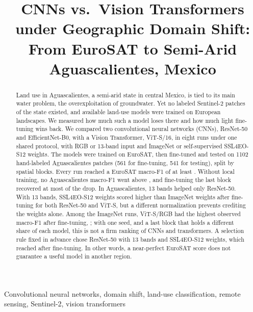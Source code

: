 \documentclass[conference]{IEEEtran}
\begin{document}
\title{CNNs vs.\ Vision Transformers under Geographic Domain Shift:
From EuroSAT to Semi-Arid Aguascalientes, Mexico}

\author{
}

\maketitle

\begin{abstract}
Land use in Aguascalientes, a semi-arid state in central Mexico, is tied to its main water
problem, the overexploitation of groundwater. Yet no labeled Sentinel-2 patches of the state
existed, and available land-use models were trained on European landscapes. We measured how
much such a model loses there and how much light fine-tuning wins back. We compared two
convolutional neural networks (CNNs), ResNet-50 and EfficientNet-B0, with a Vision Transformer,
ViT-S/16, in eight runs under one shared protocol, with RGB or 13-band input and ImageNet or
self-supervised SSL4EO-S12 weights. The models were trained on EuroSAT, then fine-tuned and tested on
\num{1102} hand-labeled Aguascalientes patches (561 for fine-tuning, 541 for testing), split by
spatial blocks. Every run reached a EuroSAT macro-F1 of at least \EuroSATMin. Without local
training, no Aguascalientes macro-F1 went above \ZeroShotMax, and fine-tuning the last
block recovered at most \RecoveryMax{} of the drop. In Aguascalientes, 13 bands helped only
ResNet-50. With 13 bands, SSL4EO-S12 weights scored higher than ImageNet weights after
fine-tuning for both ResNet-50 and ViT-S, but a different normalization prevents crediting the
weights alone. Among the ImageNet runs, ViT-S/RGB had the highest observed macro-F1 after
fine-tuning, \ImageNetLastBlockBest; with one seed, and a last block that holds a different share
of each model, this is not a firm ranking of CNNs and transformers. A selection rule fixed in
advance chose ResNet-50 with 13 bands and SSL4EO-S12 weights, which reached \AgsLastBlockBest{}
after fine-tuning. In other words, a near-perfect EuroSAT score does not guarantee a useful model
in another region.
\end{abstract}

\begin{IEEEkeywords}
Convolutional neural networks, domain shift, land-use classification, remote sensing,
Sentinel-2, vision transformers
\end{IEEEkeywords}











\end{document}
